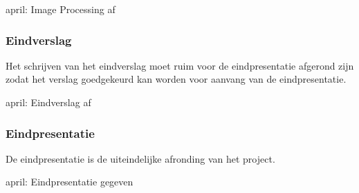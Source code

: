  april: Image Processing af

\subsubsection{Eindverslag}
Het schrijven van het eindverslag moet ruim voor de eindpresentatie afgerond
zijn zodat het verslag goedgekeurd kan worden voor aanvang van de eindpresentatie.

 april: Eindverslag af

\subsubsection{Eindpresentatie}
De eindpresentatie is de uiteindelijke afronding van het project.

 april: Eindpresentatie gegeven


